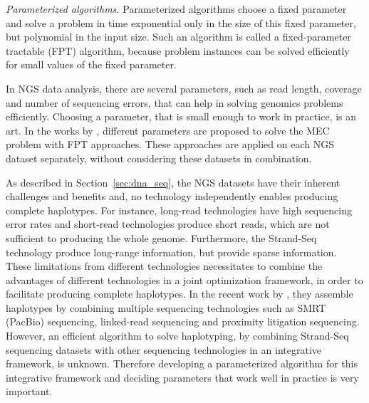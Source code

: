 \textit{Parameterized algorithms.} 
Parameterized algorithms choose a fixed parameter and solve a problem in time exponential only in the size of this fixed parameter, but polynomial in the input size. 
Such an algorithm is called a fixed-parameter tractable (FPT) algorithm, because problem instances can be solved efficiently for small values of the fixed parameter.

In NGS data analysis, there are several parameters, such as read length, coverage and number of sequencing errors, that can help in solving genomics problems efficiently. 
Choosing a parameter, that is small enough to work in practice, is an art.
In the works by \cite{he2010optimal,Patterson2015,Pirola2015, martin2016whatshap, klau2017guided}, different parameters are proposed to solve the MEC problem with FPT approaches.
These approaches are applied on each NGS dataset separately, without considering these datasets in combination.

As described in Section~\ref{sec:dna_seq}, the NGS datasets have their inherent challenges and benefits and, no technology independently enables producing complete haplotypes.
For instance, long-read technologies have high sequencing error rates and short-read technologies produce short reads, which are not sufficient to producing the whole genome.
Furthermore, the Strand-Seq technology produce long-range information, but provide sparse information.
These limitations from different technologies necessitates to combine the advantages of different technologies in a joint optimization framework, in order to facilitate producing complete haplotypes. 
In the recent work by \cite{edge2017hapcut2}, they assemble haplotypes by combining multiple sequencing technologies such as SMRT (PacBio) sequencing, linked-read sequencing and proximity
litigation sequencing.
However, an efficient algorithm to solve haplotyping, by combining Strand-Seq sequencing datasets with other sequencing technologies in an integrative framework, is unknown.
Therefore developing a parameterized algorithm for this integrative framework and deciding parameters that work well in practice is very important.

